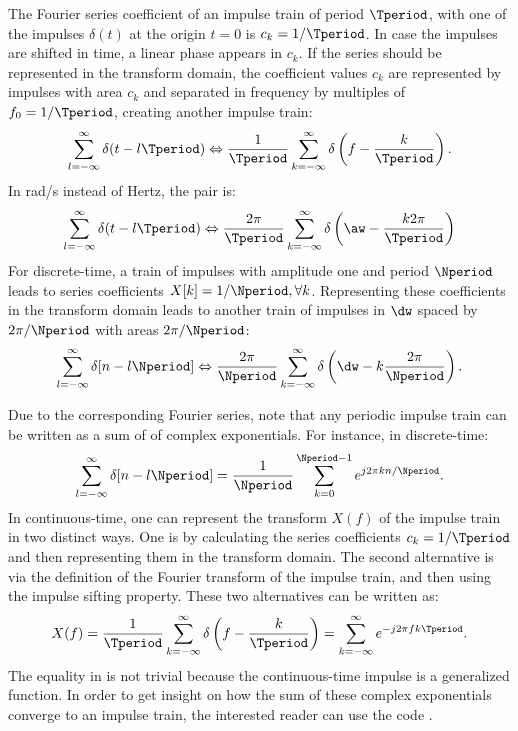 \begin{enumerate}
The Fourier series coefficient of an impulse train of period $\Tperiod$, with one of the impulses $\delta(t)$ at the origin $t=0$ is $c_k = 1/\Tperiod$. In case the impulses are shifted in time, a linear phase appears in $c_k$. If the series should be represented in the transform domain, the coefficient values $c_k$ are represented by impulses with area $c_k$ and separated in frequency by multiples of $f_0 = 1/\Tperiod$, creating another impulse train:
\begin{equation}
\sum^{\infty}_{l=-\infty} \delta(t-l \Tperiod) \Leftrightarrow \frac{1}{\Tperiod} \sum^{\infty}_{k=-\infty} \delta \left( f - \frac{k}{\Tperiod} \right).
\label{eq:impulseTrainPair}
\end{equation}
In rad/s instead of Hertz, the pair is:
\begin{equation}
\sum_{l=-\infty}^\infty \delta(t - l \Tperiod) \Leftrightarrow \frac{2 \pi}{\Tperiod} \sum_{k=-\infty}^\infty \delta \left(\aw - \frac{k 2 \pi}{\Tperiod} \right)
\label{eq:fourierPropertyImpulseTrain}
\end{equation}
For discrete-time, a train of impulses with amplitude one and period $\Nperiod$ leads to series coefficients $X[k]=1/\Nperiod, \forall k$. Representing these coefficients in the transform domain leads to another train of impulses in $\dw$ spaced by $2 \pi / \Nperiod$ with areas $2\pi/\Nperiod$:
\[
\sum_{l=-\infty}^\infty \delta[n - l \Nperiod] \Leftrightarrow \frac{2 \pi}{\Nperiod} \sum_{k=-\infty}^\infty \delta \left(\dw - k \frac{2 \pi}{\Nperiod}\right).
\]

Due to the corresponding Fourier series, note that any periodic impulse train can be written as a sum of of complex exponentials. For instance, in discrete-time:
\begin{equation}
\sum_{l=-\infty}^\infty \delta[n-l\Nperiod]=\frac{1}{\Nperiod}\sum_{k=0}^{\Nperiod-1}e^{ j 2\pi k n / \Nperiod}.
\end{equation}
In continuous-time, one can represent the transform $X(f)$ of the impulse train in two distinct ways. One is by calculating the series coefficients $c_k=1/\Tperiod$ and then representing them in the transform domain. The second alternative is via the definition of the Fourier transform of the impulse train, and then using the impulse sifting property. These two alternatives can be written as:
\begin{equation}
X(f) = \frac{1}{\Tperiod}\sum^{\infty}_{k=-\infty} \delta \left( f - \frac{k}{\Tperiod} \right) = \sum^{\infty}_{k=-\infty} e^{-j 2 \pi f k \Tperiod}.
\label{eq:impulsesAndExponentials}
\end{equation}
The equality in  is not trivial because the continuous-time impulse is a generalized function. In order to get insight on how the sum of these complex exponentials converge to an impulse train, the interested reader can use
the code .


\end{enumerate}
